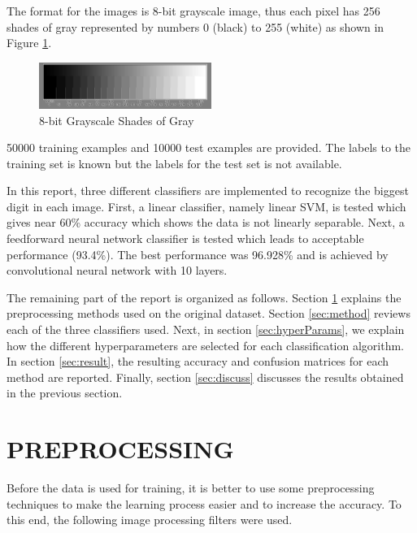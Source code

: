 \documentclass[letterpaper, 10 pt, conference]{ieeeconf}  %
\begin{document}
The format for the images is 8-bit grayscale image, thus each pixel has 256 shades of gray represented by numbers 0 (black) to 255 (white) as shown in Figure \ref{fig:maxeig2}.

\begin{figure}
	\begin{center}
			\includegraphics[width=0.5\textwidth]{figures/21stepwide8bit.jpg}  %
		\caption{8-bit Grayscale Shades of Gray}
		\label{fig:maxeig2}
	\end{center}
\end{figure}
50000 training examples and 10000 test examples are provided. The labels to the training set is known but the labels for the test set is not available.

In this report, three different classifiers are implemented to recognize the biggest digit in each image. First, a linear classifier, namely linear SVM, is tested which gives near 60\% accuracy which shows the data is not linearly separable. Next, a feedforward neural network classifier is tested which leads to acceptable performance (93.4\%). The best performance was 96.928\% and is achieved by convolutional neural network with 10 layers.

The remaining part of the report is organized as follows. Section \ref{sec:preprocess} explains the preprocessing methods used on the original dataset. Section \ref{sec:method} reviews each of the three classifiers used. Next, in section \ref{sec:hyperParams}, we explain how the different hyperparameters are selected for each classification algorithm. In section \ref{sec:result}, the resulting accuracy and confusion matrices for each method are reported. Finally, section \ref{sec:discuss} discusses the results obtained in the previous section.
\section{PREPROCESSING}\label{sec:preprocess}
Before the data is used for training, it is better to use some preprocessing techniques to make the learning process easier and to increase the accuracy. To this end, the following image processing filters were used. 
\end{document}
